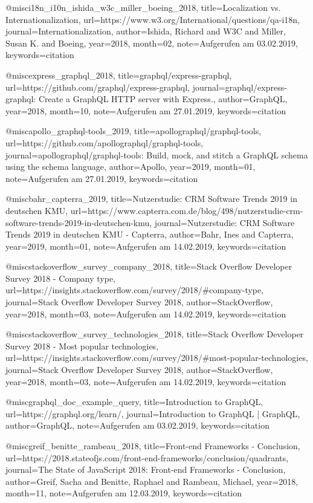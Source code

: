 
@misc{i18n_i10n_ishida_w3c_miller_boeing_2018, title={Localization vs. Internationalization}, url={https://www.w3.org/International/questions/qa-i18n}, journal={Internationalization}, author={Ishida, Richard and W3C and Miller, Susan K. and Boeing}, year={2018}, month={02}, note={Aufgerufen am 03.02.2019}, keywords={citation}}

@misc{express_graphql_2018, title={graphql/express-graphql}, url={https://github.com/graphql/express-graphql}, journal={graphql/express-graphql: Create a GraphQL HTTP server with Express.}, author={GraphQL}, year={2018}, month={10}, note={Aufgerufen am 27.01.2019}, keywords={citation}}

@misc{apollo_graphql-tools_2019, title={apollographql/graphql-tools}, url={https://github.com/apollographql/graphql-tools}, journal={apollographql/graphql-tools: Build, mock, and stitch a GraphQL schema using the schema language}, author={Apollo}, year={2019}, month={01}, note={Aufgerufen am 27.01.2019}, keywords={citation}}

@misc{bahr_capterra_2019, title={Nutzerstudie: CRM Software Trends 2019 in deutschen KMU}, url={https://www.capterra.com.de/blog/498/nutzerstudie-crm-software-trends-2019-in-deutschen-kmu}, journal={Nutzerstudie: CRM Software Trends 2019 in deutschen KMU - Capterra}, author={Bahr, Ines and Capterra}, year={2019}, month={01}, note={Aufgerufen am 14.02.2019}, keywords={citation}}

@misc{stackoverflow_survey_company_2018, title={Stack Overflow Developer Survey 2018 - Company type}, url={https://insights.stackoverflow.com/survey/2018/#company-type}, journal={Stack Overflow Developer Survey 2018}, author={StackOverflow}, year={2018}, month={03}, note={Aufgerufen am 14.02.2019}, keywords={citation}}

@misc{stackoverflow_survey_technologies_2018, title={Stack Overflow Developer Survey 2018 - Most popular technologies}, url={https://insights.stackoverflow.com/survey/2018/#most-popular-technologies}, journal={Stack Overflow Developer Survey 2018}, author={StackOverflow}, year={2018}, month={03}, note={Aufgerufen am 14.02.2019}, keywords={citation}}

@misc{graphql_doc_example_query, title={Introduction to GraphQL}, url={https://graphql.org/learn/}, journal={Introduction to GraphQL | GraphQL}, author={GraphQL}, note={Aufgerufen am 03.02.2019}, keywords={citation}}

@misc{greif_benitte_rambeau_2018, title={Front-end Frameworks - Conclusion}, url={https://2018.stateofjs.com/front-end-frameworks/conclusion/quadrants}, journal={The State of JavaScript 2018: Front-end Frameworks - Conclusion}, author={Greif, Sacha and Benitte, Raphael and Rambeau, Michael}, year={2018}, month={11}, note={Aufgerufen am 12.03.2019}, keywords={citation}}

